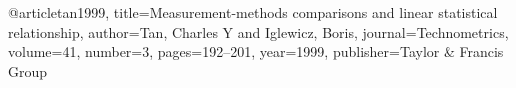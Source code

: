 @article{tan1999,
  title={Measurement-methods comparisons and linear statistical relationship},
  author={Tan, Charles Y and Iglewicz, Boris},
  journal={Technometrics},
  volume={41},
  number={3},
  pages={192--201},
  year={1999},
  publisher={Taylor \& Francis Group}
}